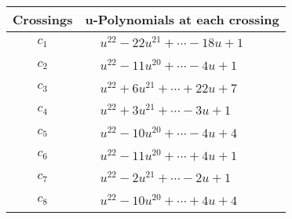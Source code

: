 \documentclass[1p]{elsarticle_modified}
\theoremstyle{definition}
\begin{document}
\begin{tabular}{m{50pt}|m{274pt}}
Crossings & \hspace{64pt}u-Polynomials at each crossing \\
\hline $$\begin{aligned}c_{1}\end{aligned}$$&$\begin{aligned}
&u^{22}-22 u^{21}+\cdots-18 u+1
\end{aligned}$\\
\hline $$\begin{aligned}c_{2}\end{aligned}$$&$\begin{aligned}
&u^{22}-11 u^{20}+\cdots-4 u+1
\end{aligned}$\\
\hline $$\begin{aligned}c_{3}\end{aligned}$$&$\begin{aligned}
&u^{22}+6 u^{21}+\cdots+22 u+7
\end{aligned}$\\
\hline $$\begin{aligned}c_{4}\end{aligned}$$&$\begin{aligned}
&u^{22}+3 u^{21}+\cdots-3 u+1
\end{aligned}$\\
\hline $$\begin{aligned}c_{5}\end{aligned}$$&$\begin{aligned}
&u^{22}-10 u^{20}+\cdots-4 u+4
\end{aligned}$\\
\hline $$\begin{aligned}c_{6}\end{aligned}$$&$\begin{aligned}
&u^{22}-11 u^{20}+\cdots+4 u+1
\end{aligned}$\\
\hline $$\begin{aligned}c_{7}\end{aligned}$$&$\begin{aligned}
&u^{22}-2 u^{21}+\cdots-2 u+1
\end{aligned}$\\
\hline $$\begin{aligned}c_{8}\end{aligned}$$&$\begin{aligned}
&u^{22}-10 u^{20}+\cdots+4 u+4
\end{aligned}$\\

\end{tabular}
\end{document}
